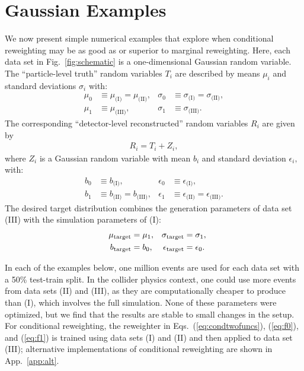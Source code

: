 \documentclass[aps,prx,reprint,preprintnumbers,superscriptaddress,nofootinbib,longbibliography,floatfix]{revtex4-2}
\DeclareRobustCommand{\App}[1]{App.~\ref{app:#1}}
\DeclareRobustCommand{\Fig}[1]{Fig.~\ref{fig:#1}}
\DeclareRobustCommand{\Eqss}[3]{Eqs.~(\ref{eq:#1}), (\ref{eq:#2}), and (\ref{eq:#3})}
\begin{document}
\section{Gaussian Examples}
\label{sec:gaussian}

We now present simple numerical examples that explore when conditional reweighting may be as good as or superior to marginal reweighting.
%
Here, each data set in \Fig{schematic} is a one-dimensional Gaussian random variable.
%
The ``particle-level truth'' random variables $T_i$ are described by means $\mu_i$ and standard deviations $\sigma_i$ with:
%
\begin{align}
    \mu_0&\equiv\mu_{\text{(I)}}=\mu_{\text{(II)}},&
    \sigma_0 &\equiv\sigma_{\text{(I)}}=\sigma_{\text{(II)}},\\
    \mu_1&\equiv\mu_{\text{(III)}},&
    \sigma_1&\equiv\sigma_{\text{(III)}}.
\end{align}
%
The corresponding ``detector-level reconstructed'' random variables $R_i$ are given by
%
\begin{align}
    R_i=T_i+Z_i,
\end{align}
%
where $Z_i$ is a Gaussian random variable with mean $b_i$ and standard deviation $\epsilon_i,$ with:
%
\begin{align}
    b_0 &\equiv b_{\text{(I)}},&
    \epsilon_0&\equiv\epsilon_{\text{(I)}},\\
    b_1 &\equiv b_{\text{(II)}}=b_{\text{(III)}},&
    \epsilon_1& \equiv\epsilon_{\text{(II)}}=\epsilon_{\text{(III)}}.
\end{align}
%
The desired target distribution combines the generation parameters of data set (III) with the simulation parameters of (I):
%
\begin{align}
  \mu_{\rm target} &= \mu_1, & \sigma_{\rm target} &= \sigma_1,\\
  \quad b_{\rm target} &= b_0, & \epsilon_{\rm target} &= \epsilon_0.
\end{align}


In each of the examples below, one million events are used for each data set with a 50\% test-train split.
%
In the collider physics context, one could use more events from data sets (II) and (III), as they are computationally cheaper to produce than (I), which involves the full simulation.
%
None of these parameters were optimized, but we find that the results are stable to small changes in the setup.
%
For conditional reweighting, the reweighter in \Eqss{condtwofuncs}{f0}{f1} is trained using data sets (I) and (II) and then applied to data set (III); alternative implementations of conditional reweighting are shown in \App{alt}.
\end{document}
